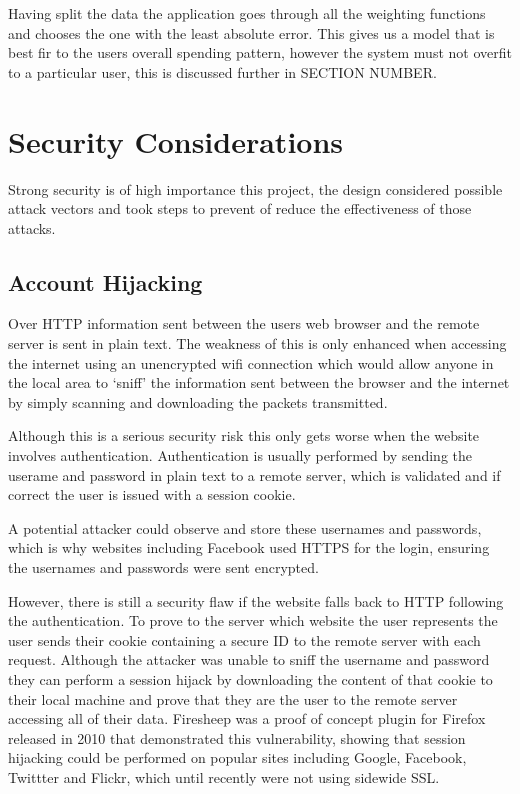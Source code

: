 Having split the data the application goes through all the weighting functions and chooses the one with the least absolute error. This gives us a model that is best fir to the users overall spending pattern, however the system must not overfit to a particular user, this is discussed further in SECTION NUMBER.



\section{Security Considerations}
Strong security is of high importance this project, the design considered possible attack vectors and took steps to prevent of reduce the effectiveness of those attacks.

\subsection{Account Hijacking}

Over HTTP information sent between the users web browser and the remote server is sent in plain text. The weakness of this is only enhanced when accessing the internet using an unencrypted wifi connection which would allow anyone in the local area to `sniff' the information sent between the browser and the internet by simply scanning and downloading the packets transmitted.

Although this is a serious security risk this only gets worse when the website involves authentication. Authentication is usually performed by sending the userame and password in plain text to a remote server, which is validated and if correct the user is issued with a session cookie.

A potential attacker could observe and store these usernames and passwords, which is why websites including Facebook used HTTPS for the login, ensuring the usernames and passwords were sent encrypted. 

However, there is still a security flaw if the website falls back to HTTP following the authentication. To prove to the server which website the user represents the user sends their cookie containing a secure ID to the remote server with each request. Although the attacker was unable to sniff the username and password they can perform a session hijack by downloading the content of that cookie to their local machine and prove that they are the user to the remote server accessing all of their data. 
% 
Firesheep was a proof of concept plugin for Firefox released in 2010 that demonstrated this vulnerability, showing that session hijacking could be performed on popular sites including Google, Facebook, Twittter and Flickr, which until recently were not using sidewide SSL.


